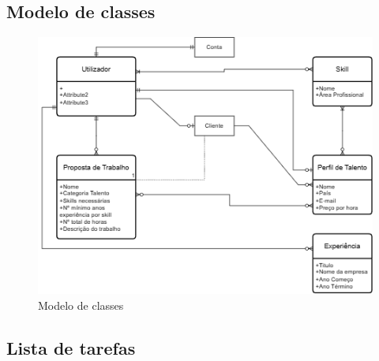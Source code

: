 \newpage

\subsection{Modelo de classes}

\begin{figure}[h]
    \centering
    \includegraphics[width=1\linewidth]{imagens/ModelodeClasses.drawio.png}
    \caption{Modelo de classes}
    \label{fig:2}
\end{figure}

\newpage

\subsection{Lista de tarefas}

